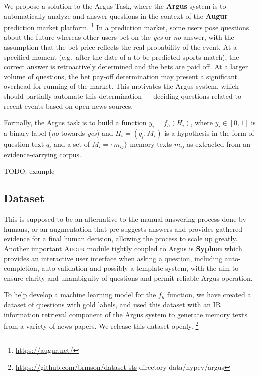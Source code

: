 \documentclass[11pt]{article}
\begin{document}
We propose a solution to the Argus Task, where
the \textbf{Argus} system \cite{arguswp} \cite{argus}
is to automatically analyze and answer questions
in the context of the \textbf{Augur} prediction market platform.%
\footnote{\url{https://augur.net/}}
In a prediction market, some users pose questions about the future
whereas other users bet on the \textit{yes} or \textit{no} answer,
with the assumption that the bet price reflects the real probability
of the event.  At a specified moment (e.g.\ after the date of a to-be-predicted sports match), the
correct answer is retroactively determined and the bets are paid off.
At a larger volume of questions, the bet pay-off determination may
present a significant overhead for running of the market.
This motivates the Argus system, which should partially automate
this determination --- deciding questions related to recent events
based on open news sources.

Formally, the Argus task is to build a function $y_i = f_h(H_i)$,
where $y_i \in [0,1]$ is a binary label (\textit{no} towards \textit{yes})
and $H_i = (q_i, M_i)$ is a hypothesis in the form of question text $q_i$
and a set of $M_i = \{m_{ij}\}$ memory texts $m_{ij}$ as extracted
from an evidence-carrying corpus.

TODO: example


\subsection{Dataset}

This is supposed
to be an alternative to the manual answering process done by humans,
or an augmentation that pre-suggests answers and provides gathered
evidence for a final human decision, allowing the process to scale
up greatly.  Another important \textsc{Augur} module tightly
coupled to Argus is \textbf{Syphon} which provides an interactive
user interface when asking a question, including auto-completion,
auto-validation and possibly a template system, with the aim to
ensure clarity and unambiguity of questions and permit reliable
Argus operation.


To help develop a machine learning model for the $f_h$ function,
we have created a dataset of questions with gold labels, and used
this dataset with an IR information retrieval component of the Argus
system to generate memory texts from a variety of news papers.
We release this dataset openly.%
\footnote{\url{https://github.com/brmson/dataset-sts} directory data/hypev/argus}
\end{document}
